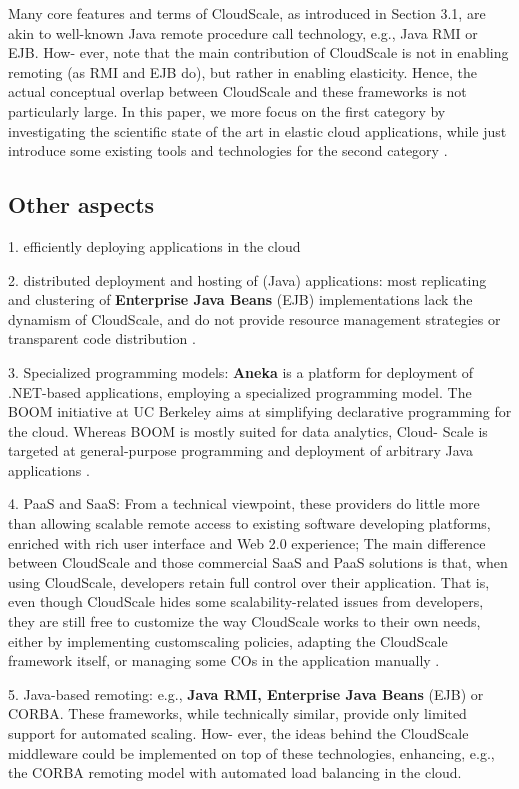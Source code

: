 \documentclass{sig-alternate}
\begin{document}
{Many core features and terms of CloudScale, as introduced in Section 3.1, are akin to well-known Java remote procedure call technology, e.g., Java RMI or EJB. How- ever, note that the main contribution of CloudScale is not in enabling remoting (as RMI and EJB do), but rather in enabling elasticity. Hence, the actual conceptual overlap between CloudScale and these frameworks is not particularly large.
In this paper, we more focus on the first category by investigating the scientific state of the art in elastic cloud applications, while just introduce some existing tools and technologies for the second category \cite{Leitner2013}.



\subsection{Other aspects}
1. efficiently deploying applications in the cloud

2. distributed deployment and hosting of (Java) applications: most replicating and clustering of \textbf{Enterprise Java Beans} (EJB) implementations lack the dynamism of CloudScale, and do not provide resource management strategies or transparent code distribution \cite{leitner2012cloudscale}.

3. Specialized programming models: \textbf{Aneka} is a platform for deployment of .NET-based applications, employing a specialized programming model. The BOOM initiative at UC Berkeley aims at simplifying declarative programming for the cloud. Whereas BOOM is mostly suited for data analytics, Cloud- Scale is targeted at general-purpose programming and deployment of arbitrary Java applications \cite{leitner2012cloudscale}. 

4. PaaS and SaaS: From a technical viewpoint, these providers do little more than allowing scalable remote access to existing software developing platforms, enriched with rich user interface and Web 2.0 experience; The main difference between CloudScale and those commercial SaaS and PaaS solutions is that, when using CloudScale, developers retain full control over their application. That is, even though CloudScale hides some scalability-related issues from developers, they are still free to customize the way CloudScale works to their own needs, either by implementing customscaling policies, adapting the CloudScale framework itself, or managing some COs in the application manually \cite{leitner2012cloudscale}. 

5. Java-based remoting: e.g.,\textbf{ Java RMI, Enterprise Java Beans} (EJB) or CORBA. These frameworks, while technically similar, provide only limited support for automated scaling. How- ever, the ideas behind the CloudScale middleware could be implemented on top of these technologies, enhancing, e.g., the CORBA remoting model with automated load balancing in the cloud.

}
\end{document}
